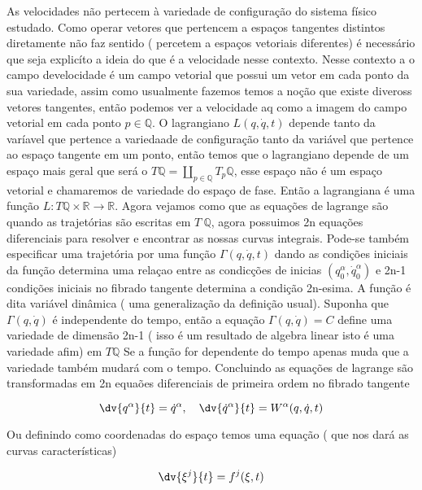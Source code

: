 \documentclass{article}
\begin{document}
As velocidades não pertecem à variedade de configuração do sistema físico estudado. Como operar vetores que pertencem a espaços tangentes distintos diretamente não faz sentido ( percetem a espaços vetoriais diferentes) é necessário que seja explicíto a ideia do que é a velocidade nesse contexto. Nesse contexto a o campo develocidade é um campo vetorial que possui um vetor em cada ponto da sua variedade, assim como usualmente fazemos temos a noção que existe diveross vetores tangentes, então podemos ver a velocidade aq como a imagem do campo vetorial em cada ponto $ p \in \mathbb{Q}$. O lagrangiano $L(q,\dot{q},t)$ depende tanto da varíavel que pertence a variedaade de configuração tanto da variável que pertence ao espaço tangente em um ponto, então temos que o lagrangiano depende de um espaço mais geral que será o $T\mathbb{Q}= \coprod_{p \in \mathbb{Q}} T_p\mathbb{Q}$, esse espaço não é um espaço vetorial e chamaremos de variedade do espaço de fase. Então a lagrangiana é uma função $L: T\mathbb{Q} \times \mathbb{R} \to \mathbb{R}$. Agora vejamos como que as equações de lagrange são quando as trajetórias são escritas em $T \ \mathbb{Q}$, agora possuimos 2n equações diferenciais para resolver e encontrar as nossas curvas integrais. Pode-se também especificar uma trajetória por uma função $\Gamma(q,\dot{q},t)$ dando as condições iniciais  da função determina uma relaçao entre as condicções de inicias $(q_0^\alpha, \dot{q}_0^\alpha)$ e 2n-1 condições iniciais no fibrado tangente  determina a condição 2n-esima. A função é dita variável dinâmica ( uma generalização da definição usual). Suponha que $\Gamma(q,\dot{q})$ é independente do tempo, então a equação $\Gamma(q,\dot{q})=C$ define uma variedade de dimensão 2n-1 ( isso é um resultado de algebra linear isto é uma variedade afim) em $T\mathbb{Q}$ Se a função for dependente do tempo apenas muda que a variedade também mudará com o tempo. Concluindo as equações de lagrange são transformadas em 2n equaões diferenciais de primeira ordem no fibrado tangente

$$\dv{q^\alpha}{t}= \dot{q}^\alpha , \quad \dv{\dot{q}^\alpha}{t}= W^\alpha(q,\dot{q},t)$$ 

Ou definindo como coordenadas do espaço temos uma equação ( que nos dará as curvas características)

$$\dv{\xi^j}{t}=f^j(\xi,t)$$
\end{document}
